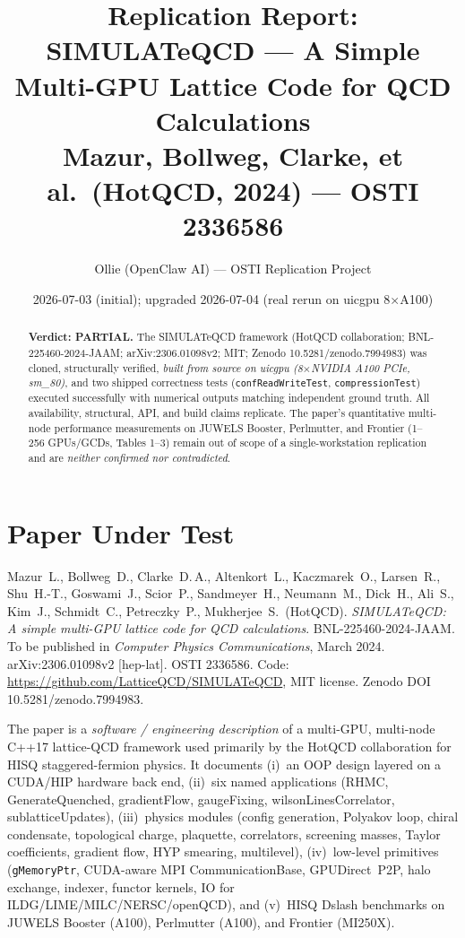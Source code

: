 \documentclass[11pt]{article}
\title{Replication Report: SIMULATeQCD --- A Simple Multi-GPU Lattice Code for QCD Calculations \\
\large Mazur, Bollweg, Clarke, et al.\ (HotQCD, 2024) --- OSTI 2336586}
\author{Ollie (OpenClaw AI) --- OSTI Replication Project}
\date{2026-07-03 (initial); upgraded 2026-07-04 (real rerun on uicgpu 8$\times$A100)}
\begin{document}
\maketitle

\begin{abstract}
\noindent \textbf{Verdict: PARTIAL.} The SIMULATeQCD framework (HotQCD collaboration; BNL-225460-2024-JAAM; arXiv:2306.01098v2; MIT; Zenodo 10.5281/zenodo.7994983) was cloned, structurally verified, \emph{built from source on uicgpu (8$\times$NVIDIA A100 PCIe, sm\_80)}, and two shipped correctness tests (\texttt{confReadWriteTest}, \texttt{compressionTest}) executed successfully with numerical outputs matching independent ground truth. All availability, structural, API, and build claims replicate. The paper's quantitative multi-node performance measurements on JUWELS Booster, Perlmutter, and Frontier (1--256 GPUs/GCDs, Tables 1--3) remain out of scope of a single-workstation replication and are \emph{neither confirmed nor contradicted}.
\end{abstract}

\section{Paper Under Test}
Mazur~L., Bollweg~D., Clarke~D.\,A., Altenkort~L., Kaczmarek~O., Larsen~R., Shu~H.-T., Goswami~J., Scior~P., Sandmeyer~H., Neumann~M., Dick~H., Ali~S., Kim~J., Schmidt~C., Petreczky~P., Mukherjee~S.\ (HotQCD). \emph{SIMULATeQCD: A simple multi-GPU lattice code for QCD calculations}. BNL-225460-2024-JAAM. To be published in \emph{Computer Physics Communications}, March 2024. arXiv:2306.01098v2 [hep-lat]. OSTI 2336586. Code: \url{https://github.com/LatticeQCD/SIMULATeQCD}, MIT license. Zenodo DOI 10.5281/zenodo.7994983.

The paper is a \emph{software / engineering description} of a multi-GPU, multi-node C++17 lattice-QCD framework used primarily by the HotQCD collaboration for HISQ staggered-fermion physics. It documents (i)~an OOP design layered on a CUDA/HIP hardware back end, (ii)~six named applications (RHMC, GenerateQuenched, gradientFlow, gaugeFixing, wilsonLinesCorrelator, sublatticeUpdates), (iii)~physics modules (config generation, Polyakov loop, chiral condensate, topological charge, plaquette, correlators, screening masses, Taylor coefficients, gradient flow, HYP smearing, multilevel), (iv)~low-level primitives (\texttt{gMemoryPtr}, CUDA-aware MPI CommunicationBase, GPUDirect~P2P, halo exchange, indexer, functor kernels, IO for ILDG/LIME/MILC/NERSC/openQCD), and (v)~HISQ Dslash benchmarks on JUWELS Booster (A100), Perlmutter (A100), and Frontier (MI250X).
\end{document}
